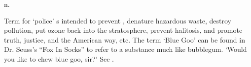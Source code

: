  n.

Term for `police' s intended to prevent ,
denature hazardous waste, destroy pollution, put ozone back into the
stratosphere, prevent halitosis, and promote truth, justice, and the American
way, etc. The term `Blue Goo' can be found in Dr. Seuss's ``Fox In Socks'' to
refer to a substance much like bubblegum. `Would you like to chew blue goo,
sir?'
See .

